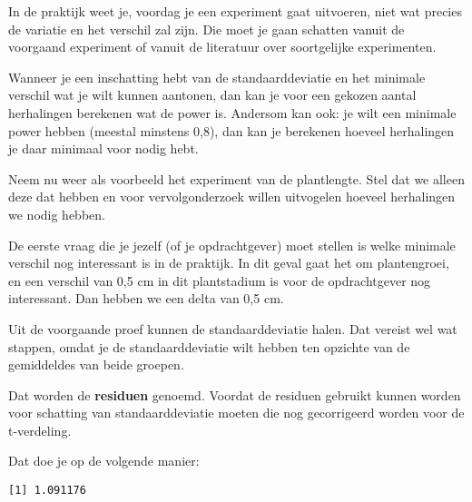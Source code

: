 \documentclass[
  letterpaper,
  DIV=11,
  numbers=noendperiod]{scrreprt}
\newenvironment{Shaded}{\begin{snugshade}}{\end{snugshade}}
\newcommand{\CommentTok}[1]{\textcolor[rgb]{0.37,0.37,0.37}{#1}}
\newcommand{\FunctionTok}[1]{\textcolor[rgb]{0.28,0.35,0.67}{#1}}
\newcommand{\NormalTok}[1]{\textcolor[rgb]{0.00,0.23,0.31}{#1}}
\newcommand{\OtherTok}[1]{\textcolor[rgb]{0.00,0.23,0.31}{#1}}
\newcommand{\SpecialCharTok}[1]{\textcolor[rgb]{0.37,0.37,0.37}{#1}}
\theoremstyle{definition}
\theoremstyle{remark}
\begin{document}
In de praktijk weet je, voordag je een experiment gaat uitvoeren, niet
wat precies de variatie en het verschil zal zijn. Die moet je gaan
schatten vanuit de voorgaand experiment of vanuit de literatuur over
soortgelijke experimenten.

Wanneer je een inschatting hebt van de standaarddeviatie en het minimale
verschil wat je wilt kunnen aantonen, dan kan je voor een gekozen aantal
herhalingen berekenen wat de power is. Andersom kan ook: je wilt een
minimale power hebben (meestal minstens 0,8), dan kan je berekenen
hoeveel herhalingen je daar minimaal voor nodig hebt.

Neem nu weer als voorbeeld het experiment van de plantlengte. Stel dat
we alleen deze dat hebben en voor vervolgonderzoek willen uitvogelen
hoeveel herhalingen we nodig hebben.

De eerste vraag die je jezelf (of je opdrachtgever) moet stellen is
welke minimale verschil nog interessant is in de praktijk. In dit geval
gaat het om plantengroei, en een verschil van 0,5 cm in dit plantstadium
is voor de opdrachtgever nog interessant. Dan hebben we een delta van
0,5 cm.

Uit de voorgaande proef kunnen de standaarddeviatie halen. Dat vereist
wel wat stappen, omdat je de standaarddeviatie wilt hebben ten opzichte
van de gemiddeldes van beide groepen.

Dat worden de \textbf{residuen} genoemd. Voordat de residuen gebruikt
kunnen worden voor schatting van standaarddeviatie moeten die nog
gecorrigeerd worden voor de t-verdeling.

Dat doe je op de volgende manier:

\begin{Shaded}
\end{Shaded}

\begin{verbatim}
[1] 1.091176
\end{verbatim}
\end{document}
